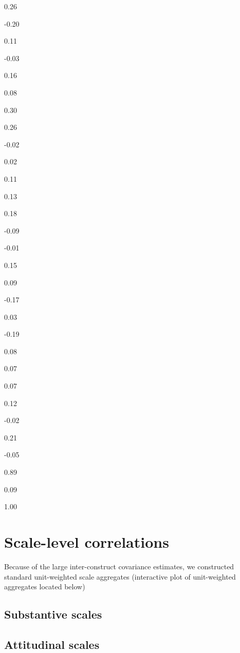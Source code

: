 \documentclass[
]{book}
\begin{document}
0.26

-0.20

0.11

-0.03

0.16

0.08

0.30

0.26

-0.02

0.02

0.11

0.13

0.18

-0.09

-0.01

0.15

0.09

-0.17

0.03

-0.19

0.08

0.07

0.07

0.12

-0.02

0.21

-0.05

0.89

0.09

1.00

\hypertarget{scale-level-correlations}{%
\section{Scale-level correlations}\label{scale-level-correlations}}

Because of the large inter-construct covariance estimates, we constructed standard unit-weighted scale aggregates (interactive plot of unit-weighted aggregates located below)

\hypertarget{substantive-scales}{%
\subsection{Substantive scales}\label{substantive-scales}}

\hypertarget{htmlwidget-6a4ea0e3694c875faccc}{}

\hypertarget{attitudinal-scales}{%
\subsection{Attitudinal scales}\label{attitudinal-scales}}

\hypertarget{htmlwidget-fc736efc9c0a688bed0c}{}
\end{document}
